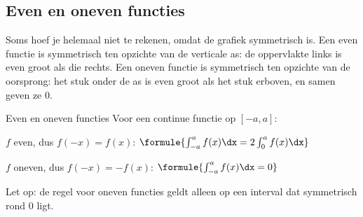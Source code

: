 
\begin{oefeningen}
\end{oefeningen}

\subsection{Even en oneven functies}

Soms hoef je helemaal niet te rekenen, omdat de grafiek symmetrisch is. Een even functie is symmetrisch ten opzichte van de verticale as: de oppervlakte links is even groot als die rechts. Een oneven functie is symmetrisch ten opzichte van de oorsprong: het stuk onder de as is even groot als het stuk erboven, en samen geven ze 0.



\begin{theorie}
\begin{stelling}{Even en oneven functies}
Voor een continue functie op $[-a, a]$:

\vspace{1mm}
$f$ even, dus $f(-x) = f(x)$: \quad $\formule{\int_{-a}^{a} f(x)\dx = 2\int_0^a f(x)\dx}$

\vspace{1.5mm}
$f$ oneven, dus $f(-x) = -f(x)$: \quad $\formule{\int_{-a}^{a} f(x)\dx = 0}$
\end{stelling}
\end{theorie}

Let op: de regel voor oneven functies geldt alleen op een interval dat symmetrisch rond 0 ligt.

